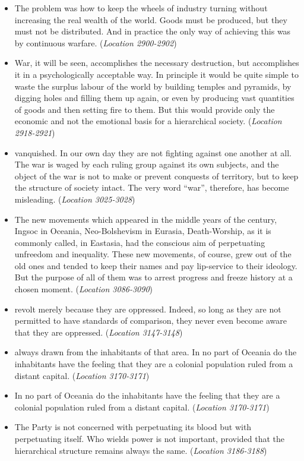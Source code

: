 \documentclass[12pt]{article}
\begin{document}
\begin{itemize}
\item {The problem was how to keep the wheels of industry turning without increasing the real wealth of the world. Goods must be produced, but they must not be distributed. And in practice the only way of achieving this was by continuous warfare. (\textit{Location 2900-2902})}
\item {War, it will be seen, accomplishes the necessary destruction, but accomplishes it in a psychologically acceptable way. In principle it would be quite simple to waste the surplus labour of the world by building temples and pyramids, by digging holes and filling them up again, or even by producing vast quantities of goods and then setting fire to them. But this would provide only the economic and not the emotional basis for a hierarchical society. (\textit{Location 2918-2921})}
\item {vanquished. In our own day they are not fighting against one another at all. The war is waged by each ruling group against its own subjects, and the object of the war is not to make or prevent conquests of territory, but to keep the structure of society intact. The very word “war”, therefore, has become misleading. (\textit{Location 3025-3028})}
\item {The new movements which appeared in the middle years of the century, Ingsoc in Oceania, Neo-Bolshevism in Eurasia, Death-Worship, as it is commonly called, in Eastasia, had the conscious aim of perpetuating unfreedom and inequality. These new movements, of course, grew out of the old ones and tended to keep their names and pay lip-service to their ideology. But the purpose of all of them was to arrest progress and freeze history at a chosen moment. (\textit{Location 3086-3090})}
\item {revolt merely because they are oppressed. Indeed, so long as they are not permitted to have standards of comparison, they never even become aware that they are oppressed. (\textit{Location 3147-3148})}
\item {always drawn from the inhabitants of that area. In no part of Oceania do the inhabitants have the feeling that they are a colonial population ruled from a distant capital. (\textit{Location 3170-3171})}
\item {In no part of Oceania do the inhabitants have the feeling that they are a colonial population ruled from a distant capital. (\textit{Location 3170-3171})}
\item {The Party is not concerned with perpetuating its blood but with perpetuating itself. Who wields power is not important, provided that the hierarchical structure remains always the same. (\textit{Location 3186-3188})}

\end{itemize}
\end{document}
